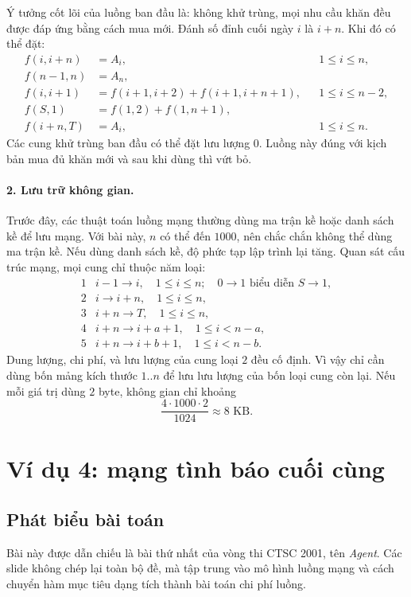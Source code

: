 \documentclass[11pt]{article}
\begin{document}
Ý tưởng cốt lõi của luồng ban đầu là: không khử trùng, mọi nhu cầu khăn đều
được đáp ứng bằng cách mua mới. Đánh số đỉnh cuối ngày \(i\) là \(i+n\). Khi
đó có thể đặt:
\[
\begin{aligned}
  f(i,i+n)&=A_i, && 1\le i\le n,\\
  f(n-1,n)&=A_n,\\
  f(i,i+1)&=f(i+1,i+2)+f(i+1,i+n+1), && 1\le i\le n-2,\\
  f(S,1)&=f(1,2)+f(1,n+1),\\
  f(i+n,T)&=A_i, && 1\le i\le n.
\end{aligned}
\]
Các cung khử trùng ban đầu có thể đặt lưu lượng \(0\). Luồng này đúng với
kịch bản mua đủ khăn mới và sau khi dùng thì vứt bỏ.

\paragraph{2. Lưu trữ không gian.}
Trước đây, các thuật toán luồng mạng thường dùng ma trận kề hoặc danh sách
kề để lưu mạng. Với bài này, \(n\) có thể đến \(1000\), nên chắc chắn không
thể dùng ma trận kề. Nếu dùng danh sách kề, độ phức tạp lập trình lại tăng.
Quan sát cấu trúc mạng, mọi cung chỉ thuộc năm loại:
\[
\begin{array}{c|l}
1 & i-1\to i,\quad 1\le i\le n;\quad 0\to 1\text{ biểu diễn }S\to 1,\\
2 & i\to i+n,\quad 1\le i\le n,\\
3 & i+n\to T,\quad 1\le i\le n,\\
4 & i+n\to i+a+1,\quad 1\le i<n-a,\\
5 & i+n\to i+b+1,\quad 1\le i<n-b.
\end{array}
\]
Dung lượng, chi phí, và lưu lượng của cung loại \(2\) đều cố định. Vì vậy chỉ
cần dùng bốn mảng kích thước \(1..n\) để lưu lưu lượng của bốn loại cung còn
lại. Nếu mỗi giá trị dùng \(2\) byte, không gian chỉ khoảng
\[
  \frac{4\cdot 1000\cdot 2}{1024}\approx 8\text{ KB}.
\]

\section{Ví dụ 4: mạng tình báo cuối cùng}

\subsection{Phát biểu bài toán}

Bài này được dẫn chiếu là bài thứ nhất của vòng thi CTSC 2001, tên
\textit{Agent}. Các slide không chép lại toàn bộ đề, mà tập trung vào mô
hình luồng mạng và cách chuyển hàm mục tiêu dạng tích thành bài toán chi phí
luồng.
\end{document}
